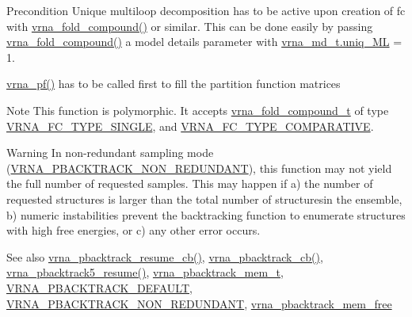 \begin{DoxyPrecond}{Precondition}
Unique multiloop decomposition has to be active upon creation of {\ttfamily fc} with \mbox{\hyperlink{group__fold__compound_ga6601d994ba32b11511b36f68b08403be}{vrna\+\_\+fold\+\_\+compound()}} or similar. This can be done easily by passing \mbox{\hyperlink{group__fold__compound_ga6601d994ba32b11511b36f68b08403be}{vrna\+\_\+fold\+\_\+compound()}} a model details parameter with \mbox{\hyperlink{group__model__details_ade065b814a4e2e72ead93ab502613ed2}{vrna\+\_\+md\+\_\+t.\+uniq\+\_\+\+ML}} = 1. 

\mbox{\hyperlink{group__part__func__global_ga29e256d688ad221b78d37f427e0e99bc}{vrna\+\_\+pf()}} has to be called first to fill the partition function matrices
\end{DoxyPrecond}
\begin{DoxyNote}{Note}
This function is polymorphic. It accepts \mbox{\hyperlink{group__fold__compound_ga1b0cef17fd40466cef5968eaeeff6166}{vrna\+\_\+fold\+\_\+compound\+\_\+t}} of type \mbox{\hyperlink{group__fold__compound_gga01a4ff86fa71deaaa5d1abbd95a1447da7e264dd3cf2dc9b6448caabcb7763cd6}{V\+R\+N\+A\+\_\+\+F\+C\+\_\+\+T\+Y\+P\+E\+\_\+\+S\+I\+N\+G\+LE}}, and \mbox{\hyperlink{group__fold__compound_gga01a4ff86fa71deaaa5d1abbd95a1447dab821ce46ea3cf665be97df22a76f5023}{V\+R\+N\+A\+\_\+\+F\+C\+\_\+\+T\+Y\+P\+E\+\_\+\+C\+O\+M\+P\+A\+R\+A\+T\+I\+VE}}.
\end{DoxyNote}
\begin{DoxyWarning}{Warning}
In non-\/redundant sampling mode (\mbox{\hyperlink{group__subopt__stochbt_ga9d580ce645aa0c38b69afdf56c332200}{V\+R\+N\+A\+\_\+\+P\+B\+A\+C\+K\+T\+R\+A\+C\+K\+\_\+\+N\+O\+N\+\_\+\+R\+E\+D\+U\+N\+D\+A\+NT}}), this function may not yield the full number of requested samples. This may happen if a) the number of requested structures is larger than the total number of structuresin the ensemble, b) numeric instabilities prevent the backtracking function to enumerate structures with high free energies, or c) any other error occurs.
\end{DoxyWarning}
\begin{DoxySeeAlso}{See also}
\mbox{\hyperlink{group__subopt__stochbt_ga6fc5ce952995e53baef52cad5581c063}{vrna\+\_\+pbacktrack\+\_\+resume\+\_\+cb()}}, \mbox{\hyperlink{group__subopt__stochbt_ga843fa953a15337b15cc68401adad84d7}{vrna\+\_\+pbacktrack\+\_\+cb()}}, \mbox{\hyperlink{group__subopt__stochbt_gac5d7065196975b803daeb4e094ba1cb9}{vrna\+\_\+pbacktrack5\+\_\+resume()}}, \mbox{\hyperlink{group__subopt__stochbt_gaa59c30efbed96bf9aaf8005584c72e63}{vrna\+\_\+pbacktrack\+\_\+mem\+\_\+t}}, \mbox{\hyperlink{group__subopt__stochbt_ga760aa2fb2d5e3d7521a11454a21e9b9f}{V\+R\+N\+A\+\_\+\+P\+B\+A\+C\+K\+T\+R\+A\+C\+K\+\_\+\+D\+E\+F\+A\+U\+LT}}, \mbox{\hyperlink{group__subopt__stochbt_ga9d580ce645aa0c38b69afdf56c332200}{V\+R\+N\+A\+\_\+\+P\+B\+A\+C\+K\+T\+R\+A\+C\+K\+\_\+\+N\+O\+N\+\_\+\+R\+E\+D\+U\+N\+D\+A\+NT}}, \mbox{\hyperlink{group__subopt__stochbt_gae64fbdef59e7f503d7e920aac279212b}{vrna\+\_\+pbacktrack\+\_\+mem\+\_\+free}}
\end{DoxySeeAlso}

